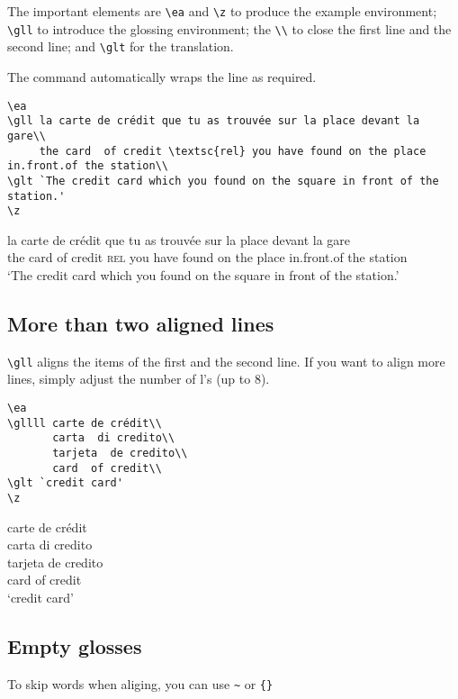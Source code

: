 \documentclass[output=guidelines]{langscibook}
\newcommand{\cmd}[1]{\texttt{\textbackslash#1}}
\begin{document}
The important elements are \cmd{ea} and \cmd{z} to produce the example environment; \cmd{gll} to introduce the glossing environment; the \texttt{\textbackslash\textbackslash} to close the first line and the second line; and \cmd{glt} for the translation. 

The command automatically wraps the line as required. 
\begin{lstlisting}
\ea
\gll la carte de crédit que tu as trouvée sur la place devant la gare\\
     the card  of credit \textsc{rel} you have found on the place in.front.of the station\\
\glt `The credit card which you found on the square in front of the station.'     
\z
 \end{lstlisting}
\ea
\gll la carte de crédit que tu as trouvée sur la place devant la gare\\
     the card  of credit \textsc{rel} you have found on the place in.front.of the station\\
\glt `The credit card which you found on the square in front of the station.'     
\z



\subsection{More than two aligned lines}
\cmd{gll} aligns the items of the first and the second line. If you want to align more lines, simply adjust the number of l's (up to 8).


\begin{minipage}{.55\textwidth}
\begin{lstlisting}
\ea
\gllll carte de crédit\\
       carta  di credito\\
       tarjeta  de credito\\
       card  of credit\\
\glt `credit card'     
\z
 \end{lstlisting}
\end{minipage}
\parbox{.45\textwidth}{ 
\ea
\gllll carte de crédit\\
       carta  di credito\\
       tarjeta  de credito\\
       card  of credit\\
\glt `credit card'     
\z
}


\subsection{Empty glosses}
To skip words when aliging, you can use \texttt{\textasciitilde} or \texttt{\{\}}
\end{document}
